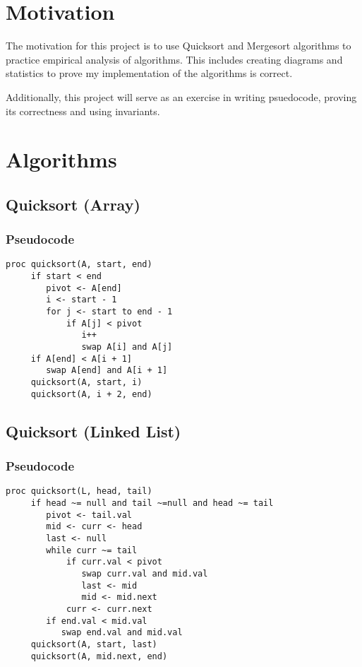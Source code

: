 \documentclass[a4paper,12pt]{article}
\begin{document}
\section{Motivation}

The motivation for this project is to use Quicksort and Mergesort algorithms to practice empirical analysis of algorithms.
This includes creating diagrams and statistics to prove my implementation of the algorithms is correct.

Additionally, this project will serve as an exercise in writing psuedocode, proving its correctness and using invariants.

\section{Algorithms}
\subsection{Quicksort (Array)}
\subsubsection{Pseudocode}
\begin{verbatim}
proc quicksort(A, start, end)
     if start < end
        pivot <- A[end]
        i <- start - 1 
        for j <- start to end - 1
            if A[j] < pivot
               i++
               swap A[i] and A[j]
     if A[end] < A[i + 1]
        swap A[end] and A[i + 1]
     quicksort(A, start, i)
     quicksort(A, i + 2, end)
\end{verbatim}
\subsection{Quicksort (Linked List)}
\subsubsection{Pseudocode}
\begin{verbatim}
proc quicksort(L, head, tail)
     if head ~= null and tail ~=null and head ~= tail
        pivot <- tail.val
        mid <- curr <- head
        last <- null
        while curr ~= tail
            if curr.val < pivot
               swap curr.val and mid.val
               last <- mid
               mid <- mid.next
            curr <- curr.next
        if end.val < mid.val
           swap end.val and mid.val
     quicksort(A, start, last)
     quicksort(A, mid.next, end)
\end{verbatim}
\end{document}
